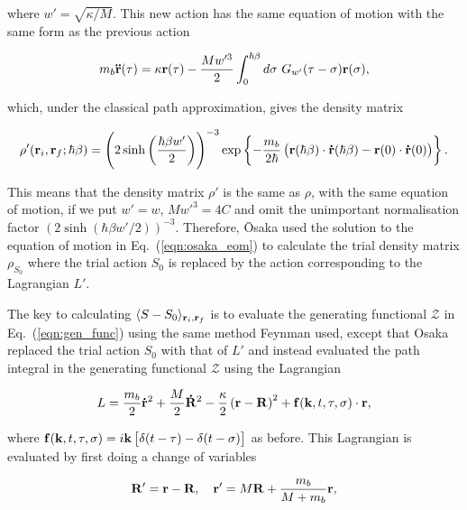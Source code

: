 where $w' = \sqrt{\kappa / M}$. This new action has the same equation of motion with the same form as the previous action

\begin{equation}\label{eqn:osaka_eom}
    m_b \vb{\ddot{r}}(\tau) = \kappa \vb{r}(\tau) - \frac{Mw'^3}{2} \int^{\hbar\beta}_0 d\sigma\ G_{w'}(\tau - \sigma) \vb{r}(\sigma),
\end{equation}

which, under the classical path approximation, gives the density matrix

\begin{equation}
    \rho'(\vb{r}_i, \vb{r}_f; \hbar\beta) = \left(2 \sinh\left(\frac{\hbar\beta w'}{2}\right)\right)^{-3} \exp \left\{-\frac{m_b}{2\hbar}\left( \vb{r}(\hbar\beta) \cdot \vb{\dot{r}}(\hbar\beta) - \vb{r}(0) \cdot \vb{\dot{r}}(0) \right)\right\}.
\end{equation}

This means that the density matrix $\rho'$ is the same as $\rho$, with the same equation of motion, if we put $w' = w$, $Mw'^3 = 4C$ and omit the unimportant normalisation factor $(2 \sinh (\hbar \beta w' / 2))^{-3}$. Therefore, \=Osaka used the solution to the equation of motion in Eq.~(\ref{eqn:osaka_eom}) to calculate the trial density matrix $\rho_{S_0}$ where the trial action $S_0$ is replaced by the action corresponding to the Lagrangian $L'$. 

The key to calculating $\langle S - S_0 \rangle_{\vb{r}_i, \vb{r}_f}$ is to evaluate the generating functional $\mathcal{Z}$ in Eq.~(\ref{eqn:gen_func}) using the same method Feynman used, except that Osaka replaced the trial action $S_0$ with that of $L'$ and instead evaluated the path integral in the generating functional $\mathcal{Z}$ using the Lagrangian

\begin{equation}\label{eqn:osaka_lag_f}
    L = \frac{m_b}{2} \vb{\dot{r}}^2 + \frac{M}{2}\vb{\dot{R}}^2 - \frac{\kappa}{2} \left( \vb{r} - \vb{R} \right)^2 + \vb{f}(\vb{k}, t, \tau, \sigma) \cdot \vb{r},
\end{equation}

where $\vb{f}(\vb{k}, t, \tau, \sigma) = i \vb{k} \left[ \delta(t-\tau) - \delta(t-\sigma) \right]$ as before. This Lagrangian is evaluated by first doing a change of variables

\begin{equation}
    \vb{R'} = \vb{r} - \vb{R}, \quad \vb{r'} = M \vb{R} + \frac{m_b}{M + m_b} \vb{r},
\end{equation}

